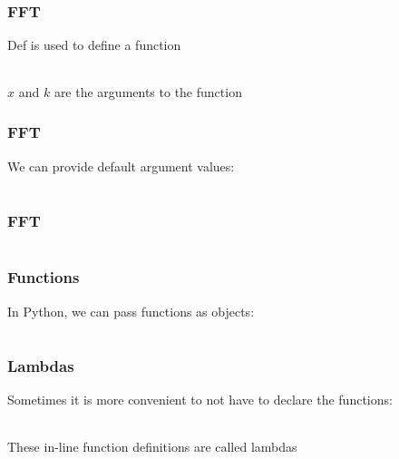 \documentclass{beamer}
\begin{document}
\begin{frame}
\frametitle{FFT}
Def is used to define a function

\begin{center}
\begin{tabular}{c}

\end{tabular}
\end{center}

$x$ and $k$ are the arguments to the function
\end{frame}

\begin{frame}
\frametitle{FFT}

We can provide default argument values:

\begin{center}
\begin{tabular}{c}

\end{tabular}
\end{center}

\end{frame}


\begin{frame}
\frametitle{FFT}

\begin{center}
\begin{tabular}{c}

\end{tabular}
\end{center}

\end{frame}

\begin{frame}
\frametitle{Functions}
In Python, we can pass functions as objects:

\begin{center}
\begin{tabular}{c}

\end{tabular}
\end{center}

\end{frame}

\begin{frame}
\frametitle{Lambdas}
Sometimes it is more convenient to not have to declare the functions:

\begin{center}
\begin{tabular}{c}

\end{tabular}
\end{center}

These in-line function definitions are called lambdas

\end{frame}
\end{document}
